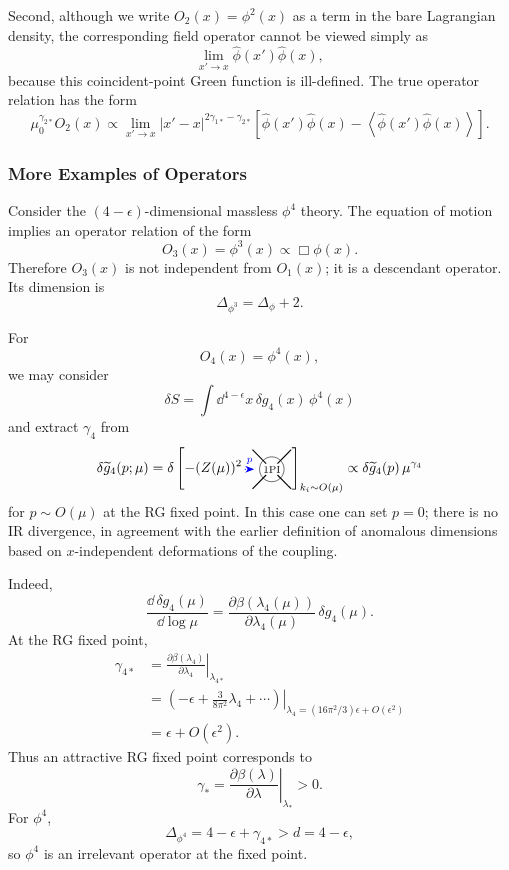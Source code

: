 Second, although we write \(O_2(x)=\phi^2(x)\) as a term in the bare
Lagrangian density, the corresponding field operator cannot be viewed simply
as
\[
  \lim_{x'\to x}\hat\phi(x')\hat\phi(x),
\]
because this coincident-point Green function is ill-defined.  The true
operator relation has the form
\[
  \mu_0^{\gamma_{2*}}O_2(x)
  \propto
  \lim_{x'\to x}
  |x'-x|^{2\gamma_{1*}-\gamma_{2*}}
  \left[
    \hat\phi(x')\hat\phi(x)
    -
    \left\langle \hat\phi(x')\hat\phi(x)\right\rangle
  \right].
\]

\subsubsection{More Examples of Operators}

Consider the \((4-\epsilon)\)-dimensional massless \(\phi^4\) theory.  The
equation of motion implies an operator relation of the form
\[
  O_3(x)=\phi^3(x)\propto \Box\phi(x).
\]
Therefore \(O_3(x)\) is not independent from \(O_1(x)\); it is a descendant
operator.  Its dimension is
\[
  \Delta_{\phi^3}=\Delta_\phi+2.
\]

For
\[
  O_4(x)=\phi^4(x),
\]
we may consider
\[
  \delta S=\int\dd^{4-\epsilon}x\,\delta g_4(x)\,\phi^4(x)
\]
and extract \(\gamma_4\) from
\[
  \delta\widetilde g_4(p;\mu)
  =
  \delta\left[
    -(Z(\mu))^2
    \begin{tikzpicture}[baseline=-0.45ex,>=Stealth,scale=0.65]
      \node[circle,draw,minimum size=0.62cm,inner sep=1pt] at (0,0) {\scriptsize 1PI};
      \draw[thick] (0.22,0.22) -- (0.75,0.75);
      \draw[thick] (0.22,-0.22) -- (0.75,-0.75);
      \draw[thick] (-0.22,0.22) -- (-0.75,0.75);
      \draw[thick] (-0.22,-0.22) -- (-0.75,-0.75);
      \draw[->,blue,densely dotted,thick] (-1.05,0) -- (-0.68,0) node[midway,above] {\scriptsize \(p\)};
    \end{tikzpicture}
    \right]_{k_i\sim O(\mu)}
  \propto
  \delta\widetilde g_4(p)\,\mu^{\gamma_4}
\]
for \(p\sim O(\mu)\) at the RG fixed point.  In this case one can set
\(p=0\); there is no IR divergence, in agreement with the earlier definition
of anomalous dimensions based on \(x\)-independent deformations of the
coupling.

Indeed,
\[
  \frac{\dd\,\delta g_4(\mu)}{\dd\log\mu}
  =
  \frac{\partial\beta(\lambda_4(\mu))}
       {\partial\lambda_4(\mu)}
  \,\delta g_4(\mu).
\]
At the RG fixed point,
\[
\begin{aligned}
  \gamma_{4*}
  &=
  \left.
  \frac{\partial\beta(\lambda_4)}
       {\partial\lambda_4}
  \right|_{\lambda_{4*}}
\\
  &=
  \left.
  \left(-\epsilon+\frac{3}{8\pi^2}\lambda_4+\cdots\right)
  \right|_{\lambda_4=(16\pi^2/3)\epsilon+O(\epsilon^2)}
\\
  &=
  \epsilon+O(\epsilon^2).
\end{aligned}
\]
Thus an attractive RG fixed point corresponds to
\[
  \gamma_*=
  \left.
  \frac{\partial\beta(\lambda)}
       {\partial\lambda}
  \right|_{\lambda_*}
  >0.
\]
For \(\phi^4\),
\[
  \Delta_{\phi^4}=4-\epsilon+\gamma_{4*}>d=4-\epsilon,
\]
so \(\phi^4\) is an irrelevant operator at the fixed point.

